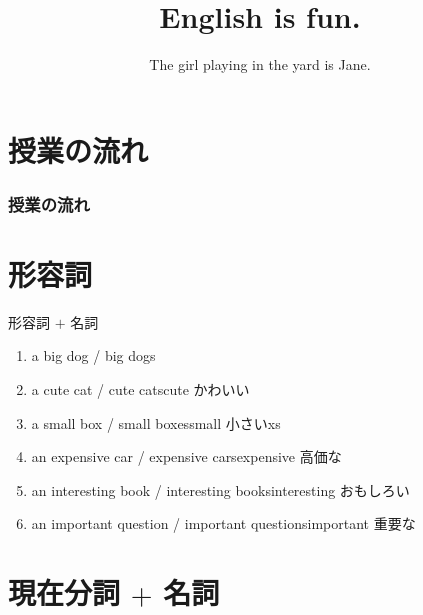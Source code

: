 \documentclass[aspectratio=169,xcolor={dvipsnames,table}]{beamer}
\title{English is fun.}
\subtitle{The girl playing in the yard is Jane.}
\author{}
\institute[]{}
\date[]
\begin{document}
\begin{frame}[plain]
  \titlepage
\end{frame}

\section*{授業の流れ}
\begin{frame}[plain]
  \frametitle{授業の流れ}
  \tableofcontents
\end{frame}

\section{形容詞}
 \begin{frame}[plain]{形容詞 $+$ 名詞}
 \begin{enumerate}
  \item a big dog / big dogs
  \item a cute cat / cute cats\hfill{\scriptsize cute  かわいい}
  \item a small box / small boxes\hfill{\scriptsize small  小さいxs}
  \item an expensive car / expensive cars\hfill{\scriptsize expensive  高価な}
  \item an interesting book / interesting books\hfill{\scriptsize interesting  おもしろい}
  \item an important question / important questions\hfill{\scriptsize important  重要な}
 \end{enumerate}

\mbox{}\hfill{\scriptsize {}}
 \end{frame}
\section{現在分詞 $+$ 名詞}
\end{document}

